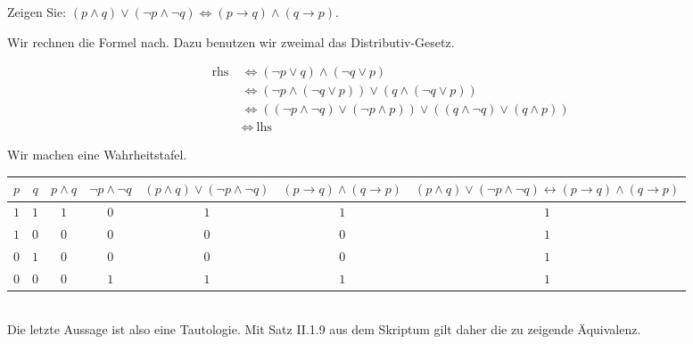 
\begin{exercise}[19]

Zeigen Sie:
$(p \land q) \lor (\neg p \land \neg q) \Leftrightarrow (p \to q) \land (q \to p)$.

\end{exercise}


Wir rechnen die Formel nach.
Dazu benutzen wir zweimal das Distributiv-Gesetz.

\begin{align*}
    \text{rhs}~
    & \iff
    (\neg p \lor q) \land (\neg q \lor p) \\
    & \iff
    (\neg p \land (\neg q \lor p)) \lor (q \land (\neg q \lor p)) \\
    & \iff
    ((\neg p \land \neg q) \lor (\neg p \land p)) \lor ((q \land \neg q) \lor (q \land p)) \\
    & \iff
    ~\text{lhs}
\end{align*}


\begin{solution}

Wir machen eine Wahrheitstafel. \\

\begin{tabular}{|c|c|c|c|c|c|c|}
    \hline
    $p$ & $q$ & $p \land q$ & $\neg p \land \neg q$ & $(p \land q) \lor (\neg p \land \neg q)$ & $(p \to q) \land (q \to p)$
    & $(p \land q) \lor (\neg p \land \neg q) \leftrightarrow (p \to q) \land (q \to p)$\\
    \hline
    $1$ & $1$ & $1$ & $0$ & $1$ & $1$ & $1$\\
    \hline
    $1$ & $0$ & $0$ & $0$ & $0$ & $0$ & $1$\\
    \hline
    $0$ & $1$ & $0$ & $0$ & $0$ & $0$ & $1$\\
    \hline
    $0$ & $0$ & $0$ & $1$ & $1$ & $1$ & $1$\\
    \hline
\end{tabular} \\

Die letzte Aussage ist also eine Tautologie.
Mit Satz II.1.9 aus dem Skriptum gilt daher die zu zeigende Äquivalenz.

\end{solution}

